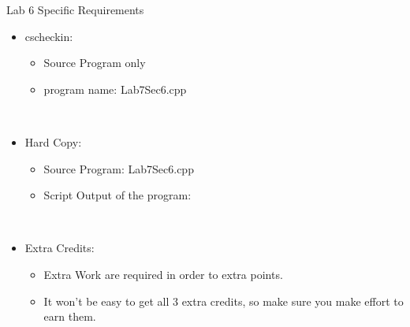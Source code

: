 \documentclass[presentation]{beamer}
\begin{document}
\begin{frame}[label=sec-7]{Lab 6 Specific Requirements}
\begin{itemize}
\item \alert{cscheckin}:
\begin{itemize}
\item \alert{Source Program} only
\item program name: \alert{Lab7Sec6.cpp}
\end{itemize}
\end{itemize}
\\
\begin{itemize}
\item \alert{Hard Copy}:
\begin{itemize}
\item \alert{Source Program}: \alert{Lab7Sec6.cpp}
\item \alert{Script Output} of the program:
\end{itemize}
\end{itemize}
\\
\begin{itemize}
\item \alert{Extra Credits}:
\begin{itemize}
\item \alert{Extra Work} are required in order to extra points.
\item It won't be easy to get all \alert{3} extra credits, so make sure you make effort to earn them.
\end{itemize}
\end{itemize}
\end{frame}
\end{document}
